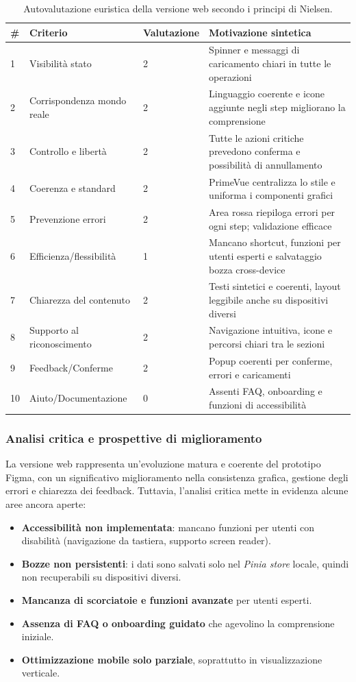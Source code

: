 \begin{table}[H]
\centering
\setlength{\tabcolsep}{6pt}
\renewcommand{\arraystretch}{1.2}
\begin{tabular}{p{0.4cm} p{4cm} p{1.5cm} p{7cm}}
\hline
\textbf{\#} & \textbf{Criterio} & \textbf{Valutazione} & \textbf{Motivazione sintetica} \\
\hline
1 & Visibilità stato & 2 & Spinner e messaggi di caricamento chiari in tutte le operazioni \\
2 & Corrispondenza mondo reale & 2 & Linguaggio coerente e icone aggiunte negli step migliorano la comprensione \\
3 & Controllo e libertà & 2 & Tutte le azioni critiche prevedono conferma e possibilità di annullamento \\
4 & Coerenza e standard & 2 & PrimeVue centralizza lo stile e uniforma i componenti grafici \\
5 & Prevenzione errori & 2 & Area rossa riepiloga errori per ogni step; validazione efficace \\
6 & Efficienza/flessibilità & 1 & Mancano shortcut, funzioni per utenti esperti e salvataggio bozza cross-device \\
7 & Chiarezza del contenuto & 2 & Testi sintetici e coerenti, layout leggibile anche su dispositivi diversi \\
8 & Supporto al riconoscimento & 2 & Navigazione intuitiva, icone e percorsi chiari tra le sezioni \\
9 & Feedback/Conferme & 2 & Popup coerenti per conferme, errori e caricamenti \\
10 & Aiuto/Documentazione & 0 & Assenti FAQ, onboarding e funzioni di accessibilità \\
\hline
\end{tabular}
\caption{Autovalutazione euristica della versione web secondo i principi di Nielsen.}
\end{table}

\subsubsection*{Analisi critica e prospettive di miglioramento}
La versione web rappresenta un’evoluzione matura e coerente del prototipo Figma, con un significativo miglioramento nella consistenza grafica, gestione degli errori e chiarezza dei feedback.
Tuttavia, l’analisi critica mette in evidenza alcune aree ancora aperte:
\begin{itemize}
\item \textbf{Accessibilità non implementata}: mancano funzioni per utenti con disabilità (navigazione da tastiera, supporto screen reader).
\item \textbf{Bozze non persistenti}: i dati sono salvati solo nel \textit{Pinia store} locale, quindi non recuperabili su dispositivi diversi.
\item \textbf{Mancanza di scorciatoie e funzioni avanzate} per utenti esperti.
\item \textbf{Assenza di FAQ o onboarding guidato} che agevolino la comprensione iniziale.
\item \textbf{Ottimizzazione mobile solo parziale}, soprattutto in visualizzazione verticale.
\end{itemize}